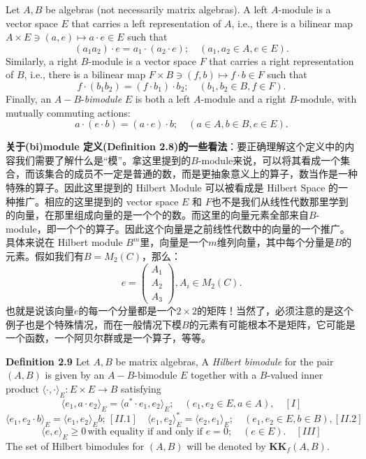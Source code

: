 Let $A, B$ be algebras (not necessarily matrix algebras). A left $A$-module is a vector space $E$ that carries a left representation of $A$, i.e., there is a bilinear map $A\times E\ni (a,e)\mapsto a\cdot e\in E$ such that \[(a_1a_2)\cdot e=a_1\cdot(a_2\cdot e); \quad (a_1,a_2\in A, e\in E).\] 
Similarly, a right $B$-module is a vector space $F$ that carries a right representation of $B$, i.e., there is a bilinear map $F\times B\ni (f,b)\mapsto f\cdot b\in F$ such that \[f\cdot(b_1b_2)=(f\cdot b_1)\cdot b_2;\quad (b_1, b_2\in B, f\in F).\] Finally, an $A-B$-\textit{bimodule} $E$ is both a left $A$-module and a right $B$-module, with mutually commuting actions: \[a\cdot(e\cdot b)=(a\cdot e)\cdot b; \quad (a\in A, b\in B, e\in E).\]

\textbf{关于(bi)module 定义(Definition 2.8)的一些看法}：要正确理解这个定义中的内容我们需要了解什么是“模”。拿这里提到的$B$-module来说，可以将其看成一个集合，而该集合的成员不一定是普通的数，而是更抽象意义上的算子，数当作是一种特殊的算子。因此这里提到的 Hilbert Module 可以被看成是 Hilbert Space 的一种推广。相应的这里提到的 vector space $E$ 和 $F$也不是我们从线性代数那里学到的向量，在那里组成向量的是一个个的数。而这里的向量元素全部来自$B$-module，即一个个的算子。因此这个向量是之前线性代数中的向量的一个推广。具体来说在 Hilbert module $B^m$里，向量是一个$m$维列向量，其中每个分量是$B$的元素。假如我们有$B=M_2(C)$，那么：\[e=\begin{pmatrix}
    A_1 \\ A_2 \\ A_3
\end{pmatrix}, A_i\in M_2(C).\] 也就是说该向量$e$的每一个分量都是一个$2\times2$的矩阵！当然了，必须注意的是这个例子也是个特殊情况，而在一般情况下模$B$的元素有可能根本不是矩阵，它可能是一个函数，一个阿贝尔群或是一个算子，等等。

\textbf{Definition 2.9} Let $A, B$ be matrix algebras, A \textit{Hilbert bimodule} for the pair $(A, B)$ is given by an $A-B$-bimodule $E$ together with a $B$-valued inner product $\langle\cdot,\cdot\rangle_E:E\times E\rightarrow B$ satisfying \[\langle e_1, a\cdot e_2\rangle_E=\langle a^*\cdot e_1, e_2\rangle_E;\quad(e_1,e_2\in E, a\in A),\quad[I] \] \[\langle e_1,e_2\cdot b\rangle_E = \langle e_1,e_2 \rangle_Eb;\,[II.1]\quad\langle e_1,e_2\rangle^*_E=\langle e_2,e_1\rangle_E;\quad(e_1, e_2\in E, b\in B), [II.2]\] \[\langle e,e\rangle_E\geq 0 \, \text{with equality if and only if }e=0;\quad (e\in E).\quad[III]\] The set of Hilbert bimodules for $(A,B)$ will be denoted by $\mathbf{KK}_f(A,B)$.

